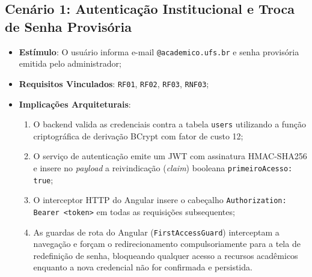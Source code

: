 \subsection{Cenário 1: Autenticação Institucional e Troca de Senha Provisória}
\label{subsec_cenario_auth}
\begin{itemize}
    \item \textbf{Estímulo}: O usuário informa e-mail \texttt{@academico.ufs.br} e senha provisória emitida pelo administrador;
    \item \textbf{Requisitos Vinculados}: \texttt{RF01}, \texttt{RF02}, \texttt{RF03}, \texttt{RNF03};
    \item \textbf{Implicações Arquiteturais}:
    \begin{enumerate}
        \item O backend valida as credenciais contra a tabela \texttt{users} utilizando a função criptográfica de derivação BCrypt com fator de custo 12;
        \item O serviço de autenticação emite um JWT com assinatura HMAC-SHA256 e insere no \textit{payload} a reivindicação (\textit{claim}) booleana \texttt{primeiroAcesso: true};
        \item O interceptor HTTP do Angular insere o cabeçalho \texttt{Authorization: Bearer <token>} em todas as requisições subsequentes;
        \item As guardas de rota do Angular (\texttt{FirstAccessGuard}) interceptam a navegação e forçam o redirecionamento compulsoriamente para a tela de redefinição de senha, bloqueando qualquer acesso a recursos acadêmicos enquanto a nova credencial não for confirmada e persistida.
    \end{enumerate}
\end{itemize}

